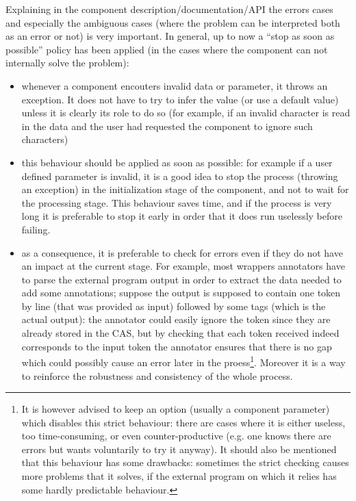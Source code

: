 \documentclass{article}
\newenvironment{xitemize}{
\begin{itemize}
  \setlength{\itemsep}{.3\baselineskip}
  \setlength{\topsep}{0pt}
  \setlength{\parskip}{0pt}
  \setlength{\parsep}{0pt}
}{\end{itemize}}
\begin{document}
Explaining in the component description/documentation/API the errors cases and especially the ambiguous cases (where the problem can be interpreted both as an error or not) is very important. In general, up to now a ``stop as soon as possible'' policy has been applied (in the cases where the component can not internally solve the problem):
\begin{xitemize}
\item whenever a component encouters invalid data or parameter, it throws an exception. It does not have to try to infer the value (or use a default value) unless it is clearly its role to do so (for example, if an invalid character is read in the data and the user had requested the component to ignore such characters)
\item this behaviour should be applied as soon as possible: for example if a user defined parameter is invalid, it is a good idea to stop the process (throwing an exception) in the initialization stage of the component, and not to wait for the processing stage. This behaviour saves time, and if the process is very long it is preferable to stop it early in order that it does run uselessly before failing. 
\item as a consequence, it is preferable to check for errors even if they do not have an impact at the current stage. For example, most wrappers annotators have to parse the external program output in order to extract the data needed to add some annotations; suppose the output is supposed to contain one token by line (that was provided as input) followed by some tags (which is the actual output): the annotator could easily ignore the token since they are already stored in the CAS, but by checking that each token received indeed corresponds to the input token the annotator ensures that there is no gap which could possibly cause an error later in the proess\footnote{It is however advised to keep an option (usually a component parameter) which disables this strict behaviour: there are cases where it is either useless, too time-consuming, or even counter-productive (e.g. one knows there are errors but wants  voluntarily to try it anyway). It should also be mentioned that this behaviour has some drawbacks: sometimes the strict checking causes more problems that it solves, if the external program on which it relies has some  hardly predictable behaviour.}. Moreover it is a way to reinforce the robustness and consistency of the whole process.
\end{xitemize}
\end{document}
